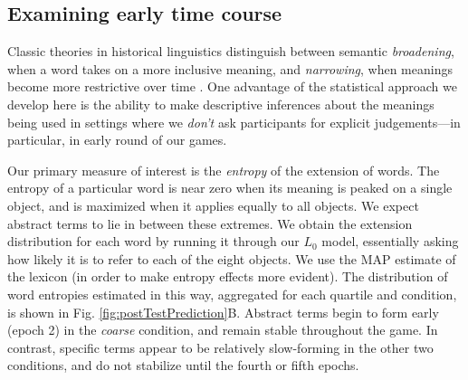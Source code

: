 \documentclass[10pt,letterpaper]{article}
\begin{document}
\subsection{Examining early time course}


Classic theories in historical linguistics distinguish between semantic \emph{broadening}, when a word takes on a more inclusive meaning, and \emph{narrowing}, when meanings become more restrictive over time \cite{TraugottDasher02_RegularitySemanticChange}. One advantage of the statistical approach we develop here is the ability to make descriptive inferences about the meanings being used in settings where we \emph{don't} ask participants for explicit judgements---in particular, in early round of our games. 


Our primary measure of interest is the \emph{entropy} of the extension of words. The entropy of a particular word is near zero when its meaning is peaked on a single object, and is maximized when it applies equally to all objects. 
We expect abstract terms to lie in between these extremes. 
We obtain the extension distribution for each word by running it through our $L_0$ model, essentially asking how likely it is to refer to each of the eight objects.
We use the MAP estimate of the lexicon (in order to make entropy effects more evident). 
The distribution of word entropies estimated in this way, aggregated for each quartile and condition, is shown in Fig. \ref{fig:postTestPrediction}B. %
Abstract terms begin to form early (epoch 2) in the \emph{coarse} condition, and remain stable throughout the game. In contrast, specific terms appear to be relatively slow-forming in the other two conditions, and do not stabilize until the fourth or fifth epochs. 
\end{document}
